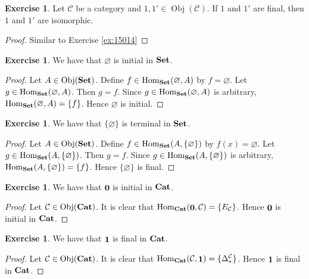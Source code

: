 \documentclass[12pt]{amsart}
\theoremstyle{definition}
\newtheorem{ex}[definition]{Exercise}
\newcommand{\Del}{\Delta}
\newcommand{\MC}{\mathcal{C}}
\newcommand{\tbf}[1]{\textbf{#1}}
\DeclareMathOperator{\Obj}{Obj}
\DeclareMathOperator{\Hom}{Hom}
\DeclareMathOperator*{\Set}{\text{\tbf{Set}}}
\DeclareMathOperator*{\Cat}{\text{\tbf{Cat}}}
\DeclareMathOperator*{\0}{\mbf{0}}
\DeclareMathOperator*{\1}{\mbf{1}}
\newcommand{\lex}[1]{\label{ex:#1}}
\newcommand{\rex}[1]{Exercise \ref{ex:#1}}
\begin{document}
	\begin{ex} \lex{15014.1}
		Let $\MC$ be a category and $1, 1' \in \Obj(\MC)$. If $1$ and $1'$ are final, then $1$ and $1'$ are isomorphic.
	\end{ex}
	
	\begin{proof}
		Similar to \rex{15014}
	\end{proof}
	
	\begin{ex} \lex{15015}
		We have that $\varnothing$ is initial in $\Set$. 
	\end{ex}
	
	\begin{proof}
		Let $A \in \Obj(\Set)$. Define $f \in \Hom_{\Set}(\varnothing, A)$ by $f = \varnothing$. Let $g \in \Hom_{\Set}(\varnothing, A)$. Then $g = f$. Since $g \in \Hom_{\Set}(\varnothing, A)$ is arbitrary, $\Hom_{\Set}(\varnothing, A) = \{f\}$. Hence $\varnothing$ is initial.
	\end{proof}

	\begin{ex} \lex{15015.1}
		We have that $ \{\varnothing\}$  is terminal in $\Set$. 
	\end{ex}
	
	\begin{proof}
		Let $A \in \Obj(\Set)$. Define $f \in \Hom_{\Set}(A, \{\varnothing\})$ by $f(x) = \varnothing$. Let $g \in \Hom_{\Set}(A, \{\varnothing\})$. Then $g = f$. Since $g \in \Hom_{\Set}(A, \{\varnothing\})$ is arbitrary, $\Hom_{\Set}(A, \{\varnothing\}) = \{f\}$. Hence $\{\varnothing\}$ is final.
	\end{proof}
	
	\begin{ex} \lex{15016}
		We have that $\0$ is initial in $\Cat$. 
	\end{ex}

	\begin{proof}
		Let $\MC \in \Obj(\Cat)$. It is clear that $\Hom_{\Cat}(\0, \MC) = \{E_\MC\}$. Hence $\0$ is initial in $\Cat$.
	\end{proof}

	\begin{ex} \lex{15016.1}
		We have that $\1$ is final in $\Cat$. 
	\end{ex}
	
	\begin{proof}
		Let $\MC \in \Obj(\Cat)$. It is clear that $\Hom_{\Cat}(\MC, \1) = \{ \Del^{\MC}_* \}$. Hence $\1$ is final in $\Cat$.
	\end{proof}
\end{document}
